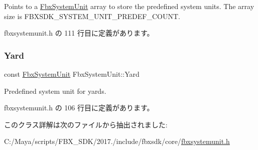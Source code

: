 Points to a \hyperlink{class_fbx_system_unit}{Fbx\+System\+Unit} array to store the predefined system units. The array size is F\+B\+X\+S\+D\+K\+\_\+\+S\+Y\+S\+T\+E\+M\+\_\+\+U\+N\+I\+T\+\_\+\+P\+R\+E\+D\+E\+F\+\_\+\+C\+O\+U\+NT. 



 fbxsystemunit.\+h の 111 行目に定義があります。

\mbox{\label{class_fbx_system_unit_a4c9612d5387f7ac06a313efd63452cd4}} 
\subsubsection{\texorpdfstring{Yard}{Yard}}
{\footnotesize\ttfamily const \hyperlink{class_fbx_system_unit}{Fbx\+System\+Unit} Fbx\+System\+Unit\+::\+Yard\hspace{0.3cm}{\ttfamily [static]}}



Predefined system unit for yards. 



 fbxsystemunit.\+h の 106 行目に定義があります。



このクラス詳解は次のファイルから抽出されました\+:\begin{DoxyCompactItemize}
\item 
C\+:/\+Maya/scripts/\+F\+B\+X\+\_\+\+S\+D\+K/2017./include/fbxsdk/core/\hyperlink{fbxsystemunit_8h}{fbxsystemunit.\+h}\end{DoxyCompactItemize}
